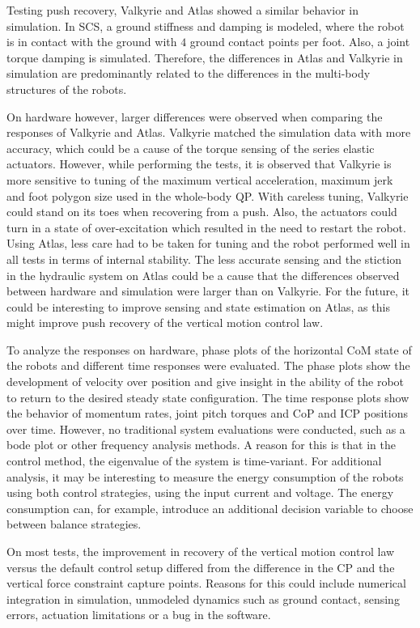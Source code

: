 Testing push recovery, Valkyrie and Atlas showed a similar behavior in simulation. In \ac{SCS}, a ground stiffness and damping is modeled, where the robot is in contact with the ground with $4$ ground contact points per foot. Also, a joint torque damping is simulated. Therefore, the differences in Atlas and Valkyrie in simulation are predominantly related to the differences in the multi-body structures of the robots.

On hardware however, larger differences were observed when comparing the responses of Valkyrie and Atlas. Valkyrie matched the simulation data with more accuracy, which could be a cause of the torque sensing of the series elastic actuators. However, while performing the tests, it is observed that Valkyrie is more sensitive to tuning of the maximum vertical acceleration, maximum jerk and foot polygon size used in the whole-body \ac{QP}. With careless tuning, Valkyrie could stand on its toes when recovering from a push. Also, the actuators could turn in a state of over-excitation which resulted in the need to restart the robot. Using Atlas, less care had to be taken for tuning and the robot performed well in all tests in terms of internal stability. The less accurate sensing and the stiction in the hydraulic system on Atlas could be a cause that the differences observed between hardware and simulation were larger than on Valkyrie. For the future, it could be interesting to improve sensing and state estimation on Atlas, as this might improve push recovery of the vertical motion control law.

To analyze the responses on hardware, phase plots of the horizontal \ac{CoM} state of the robots and different time responses were evaluated. The phase plots show the development of velocity over position and give insight in the ability of the robot to return to the desired steady state configuration. The time response plots show the behavior of momentum rates, joint pitch torques and \ac{CoP} and \ac{ICP} positions over time. However, no traditional system evaluations were conducted, such as a bode plot or other frequency analysis methods. A reason for this is that in the control method, the eigenvalue of the system is time-variant. For additional analysis, it may be interesting to measure the energy consumption of the robots using both control strategies, using the input current and voltage. The energy consumption can, for example, introduce an additional decision variable to choose between balance strategies.

On most tests, the improvement in recovery of the vertical motion control law versus the default control setup differed  from the difference in the \ac{CP} and the vertical force constraint capture points. Reasons for this could include numerical integration in simulation, unmodeled dynamics such as ground contact, sensing errors, actuation limitations or a bug in the software.

